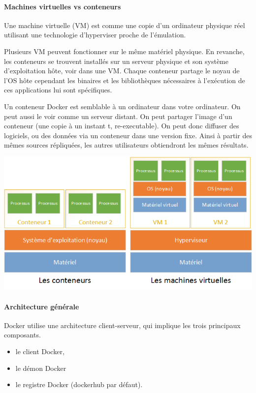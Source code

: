 \documentclass[french, 12pt]{article}%
\newcommand{\itemE}{\item[$\bullet$]}
\begin{document}
\paragraph{Machines virtuelles vs conteneurs} Une machine virtuelle (VM) est comme une copie d'un ordinateur physique réel utilisant une technologie d’hyperviser proche de l’émulation. 

Plusieurs VM peuvent fonctionner sur le même matériel physique. En revanche, les conteneurs se trouvent installés sur un serveur physique et son système d'exploitation hôte, voir dans une VM.
Chaque conteneur partage le noyau de l'OS hôte cependant les binaires et les bibliothèques nécessaires à l'exécution de ces applications lui sont spécifiques.
  
Un conteneur Docker est semblable à un ordinateur dans votre ordinateur. On peut aussi le voir comme un serveur distant.  On peut partager l’image d’un conteneur (une copie à un instant t, re-executable).  On peut donc diffuser des logiciels, ou des données via un conteneur dans une version fixe.  Ainsi à partir des mêmes sources répliquées, les autres utilisateurs obtiendront les mêmes résultats. 


\begin{center}
\includegraphics[scale=0.6]{./ressource/conteneur_vs_mv.png}
\end{center}

\paragraph{Architecture générale} Docker utilise une architecture client-serveur, qui implique les trois principaux composants.   
\begin{itemize}
\itemE le client Docker, 
\itemE le démon Docker 
\itemE le registre Docker (dockerhub par défaut).
\end{itemize}
  
\end{document}
